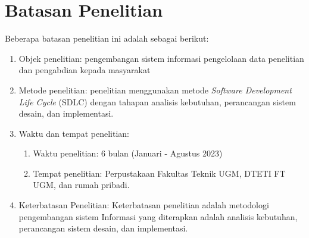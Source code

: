 		


\section{Batasan Penelitian}

Beberapa batasan penelitian ini adalah sebagai berikut:

\begin{enumerate}
\item Objek penelitian: pengembangan sistem informasi pengelolaan data penelitian dan pengabdian 
kepada masyarakat
\item Metode penelitian: penelitian menggunakan metode \textit{Software Development Life Cycle} (SDLC) dengan
tahapan analisis kebutuhan, perancangan sistem desain, dan implementasi.
\item Waktu dan tempat penelitian: 
	\begin{enumerate}
		\item Waktu penelitian: 6 bulan (Januari - Agustus 2023)
		\item Tempat penelitian: Perpustakaan Fakultas Teknik UGM, DTETI FT UGM, dan rumah pribadi.
	\end{enumerate}
\item Keterbatasan Penelitian: Keterbatasan penelitian adalah metodologi pengembangan sistem Informasi
yang diterapkan adalah analisis kebutuhan, perancangan sistem desain, dan implementasi.
\end{enumerate}

